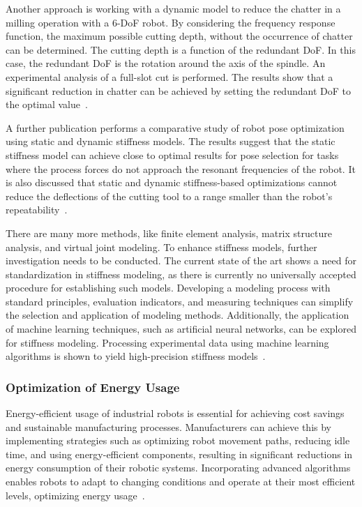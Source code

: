 \documentclass[conference]{IEEEtran}
\begin{document}
Another approach is working with a dynamic model to reduce the chatter in a milling operation with a 6-DoF robot. By considering the frequency response function, the maximum possible cutting depth, without the occurrence of chatter can be determined. The cutting depth is a function of the redundant DoF. In this case, the redundant DoF is the rotation around the axis of the spindle. An experimental analysis of a full-slot cut is performed. The results show that a significant reduction in chatter can be achieved by setting the redundant DoF to the optimal value~\cite{Wang.2022}.

A further publication performs a comparative study of robot pose optimization using static and dynamic stiffness models. The results suggest that the static stiffness model can achieve close to optimal results for pose selection for tasks where the process forces do not approach the resonant frequencies of the robot. It is also discussed that static and dynamic stiffness-based optimizations cannot reduce the deflections of the cutting tool to a range smaller than the robot's repeatability~\cite{Cvitanic.2020}.

There are many more methods, like finite element analysis, matrix structure analysis, and virtual joint modeling. 
To enhance stiffness models, further investigation needs to be conducted. The current state of the art shows a need for standardization in stiffness modeling, as there is currently no universally accepted procedure for establishing such models. Developing a modeling process with standard principles, evaluation indicators, and measuring techniques can simplify the selection and application of modeling methods. Additionally, the application of machine learning techniques, such as artificial neural networks, can be explored for stiffness modeling. Processing experimental data using machine learning algorithms is shown to yield high-precision stiffness models~\cite{Wu.2022}.\newline

\subsubsection{Optimization of Energy Usage}
Energy-efficient usage of industrial robots is essential for achieving cost savings and sustainable manufacturing processes. Manufacturers can achieve this by implementing strategies such as optimizing robot movement paths, reducing idle time, and using energy-efficient components, resulting in significant reductions in energy consumption of their robotic systems. Incorporating advanced algorithms enables robots to adapt to changing conditions and operate at their most efficient levels, optimizing energy usage~\cite{Uhlmann.2016}. 
\end{document}
